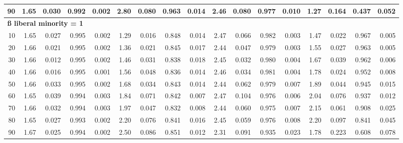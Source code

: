 \documentclass[
]{article}
\begin{document}
\begin{table}[H]
{\begin{tabular}{r|r|r|r|r|r|r|r|r|r|r|r|r|r|r|r|r}
\hline
\hspace{1em}90 & 1.65 & 0.030 & 0.992 & 0.002 & 2.80 & 0.080 & 0.963 & 0.014 & 2.46 & 0.080 & 0.977 & 0.010 & 1.27 & 0.164 & 0.437 & 0.052\\
\hline
\multicolumn{17}{l}{\textbf{ß liberal minority = 1}}\\
\hline
\hspace{1em}10 & 1.65 & 0.027 & 0.995 & 0.002 & 1.29 & 0.016 & 0.848 & 0.014 & 2.47 & 0.066 & 0.982 & 0.003 & 1.47 & 0.022 & 0.967 & 0.005\\
\hline
\hspace{1em}20 & 1.66 & 0.021 & 0.995 & 0.002 & 1.36 & 0.021 & 0.845 & 0.017 & 2.44 & 0.047 & 0.979 & 0.003 & 1.55 & 0.027 & 0.963 & 0.005\\
\hline
\hspace{1em}30 & 1.66 & 0.012 & 0.995 & 0.002 & 1.46 & 0.031 & 0.838 & 0.018 & 2.45 & 0.032 & 0.980 & 0.004 & 1.67 & 0.039 & 0.962 & 0.006\\
\hline
\hspace{1em}40 & 1.66 & 0.016 & 0.995 & 0.001 & 1.56 & 0.048 & 0.836 & 0.014 & 2.46 & 0.034 & 0.981 & 0.004 & 1.78 & 0.024 & 0.952 & 0.008\\
\hline
\hspace{1em}50 & 1.66 & 0.033 & 0.995 & 0.002 & 1.68 & 0.034 & 0.843 & 0.014 & 2.44 & 0.062 & 0.979 & 0.007 & 1.89 & 0.044 & 0.945 & 0.015\\
\hline
\hspace{1em}60 & 1.65 & 0.039 & 0.994 & 0.003 & 1.84 & 0.071 & 0.842 & 0.007 & 2.47 & 0.104 & 0.976 & 0.006 & 2.04 & 0.076 & 0.937 & 0.012\\
\hline
\hspace{1em}70 & 1.66 & 0.032 & 0.994 & 0.003 & 1.97 & 0.047 & 0.832 & 0.008 & 2.44 & 0.060 & 0.975 & 0.007 & 2.15 & 0.061 & 0.908 & 0.025\\
\hline
\hspace{1em}80 & 1.65 & 0.027 & 0.993 & 0.002 & 2.20 & 0.076 & 0.841 & 0.016 & 2.45 & 0.059 & 0.976 & 0.008 & 2.20 & 0.097 & 0.841 & 0.045\\
\hline
\hspace{1em}90 & 1.67 & 0.025 & 0.994 & 0.002 & 2.50 & 0.086 & 0.851 & 0.012 & 2.31 & 0.091 & 0.935 & 0.023 & 1.78 & 0.223 & 0.608 & 0.078\\
\hline
\end{tabular}}\begin{table}
\centering
{}
\end{table}
\end{table}
\end{document}
